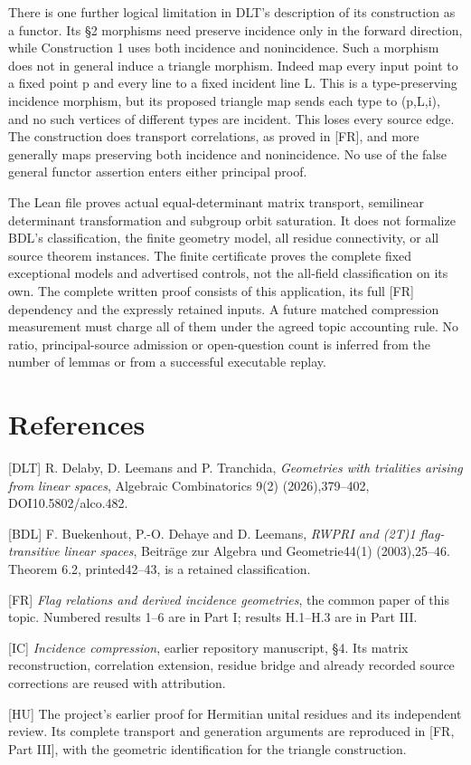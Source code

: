 \documentclass[
  11pt,
  a4paper,
]{article}
\begin{document}
There is one further logical limitation in DLT's description of its
construction as a functor. Its §2 morphisms need preserve incidence only
in the forward direction, while Construction 1 uses both incidence and
nonincidence. Such a morphism does not in general induce a triangle
morphism. Indeed map every input point to a fixed point p and every line
to a fixed incident line L. This is a type-preserving incidence
morphism, but its proposed triangle map sends each type to (p,L,i), and
no such vertices of different types are incident. This loses every
source edge. The construction does transport correlations, as proved in
{[}FR{]}, and more generally maps preserving both incidence and
nonincidence. No use of the false general functor assertion enters
either principal proof.

The Lean file proves actual equal-determinant matrix transport,
semilinear determinant transformation and subgroup orbit saturation. It
does not formalize BDL's classification, the finite geometry model, all
residue connectivity, or all source theorem instances. The finite
certificate proves the complete fixed exceptional models and advertised
controls, not the all-field classification on its own. The complete
written proof consists of this application, its full {[}FR{]} dependency
and the expressly retained inputs. A future matched compression
measurement must charge all of them under the agreed topic accounting
rule. No ratio, principal-source admission or open-question count is
inferred from the number of lemmas or from a successful executable
replay.

\section{References}\label{references}

{[}DLT{]} R. Delaby, D. Leemans and P. Tranchida, \emph{Geometries with
trialities arising from linear spaces}, Algebraic Combinatorics 9(2)
(2026),379--402, DOI10.5802/alco.482.

{[}BDL{]} F. Buekenhout, P.-O. Dehaye and D. Leemans, \emph{RWPRI and
(2T)1 flag-transitive linear spaces}, Beiträge zur Algebra und
Geometrie44(1) (2003),25--46. Theorem 6.2, printed42--43, is a retained
classification.

{[}FR{]} \emph{Flag relations and derived incidence geometries},
the common paper of this topic. Numbered results 1--6 are in Part I;
results H.1--H.3 are in Part III.

{[}IC{]} \emph{Incidence compression}, earlier repository manuscript,
§4. Its matrix reconstruction, correlation extension, residue bridge and
already recorded source corrections are reused with attribution.

{[}HU{]} The project's earlier proof for Hermitian unital residues and
its independent review. Its complete transport and generation arguments
are reproduced in [FR, Part III], with the geometric identification for
the triangle construction.
\end{document}
